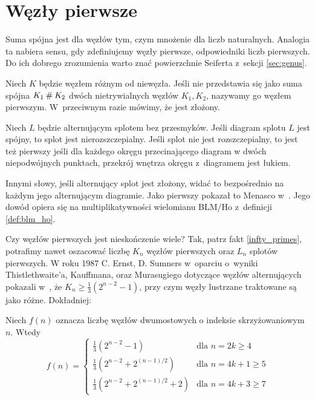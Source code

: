 \section{Węzły pierwsze}
\label{sec:prime_knots}
Suma spójna jest dla węzłów tym, czym mnożenie dla liczb naturalnych.
Analogia ta nabiera sensu, gdy zdefiniujemy węzły pierwsze, odpowiedniki liczb pierwszych.
Do ich dobrego zrozumienia warto znać powierzchnie Seiferta z~sekcji \ref{sec:genus}.

\begin{definition}
    \label{primeknot}
    Niech $K$ będzie węzłem różnym od niewęzła.
    Jeśli nie przedstawia się jako suma spójna $K_1 \mathbin{\#} K_2$
    dwóch nietrywialnych węzłów $K_1, K_2$, nazywamy go węzłem pierwszym.
    W~przeciwnym razie mówimy, że jest złożony.
\end{definition}

\begin{proposition}
    Niech $L$ będzie alternującym splotem bez przesmyków.
    Jeśli diagram splotu $L$ jest spójny, to splot jest nierozszczepialny.
    Jeśli splot nie jest rozszczepialny, to jest też pierwszy jeśli dla każdego okręgu przecinającego diagram w dwóch niepodwójnych punktach, przekrój wnętrza okręgu z~diagramem jest łukiem.
\end{proposition}

Innymi słowy, jeśli alternujący splot jest złożony, widać to bezpośrednio na każdym jego alternującym diagramie.
Jako pierwszy pokazał to Menasco w~\cite{menasco84}.
Jego dowód opiera się na multiplikatywności wielomianu BLM/Ho z~definicji \ref{def:blm_ho}.

Czy węzłów pierwszych jest nieskończenie wiele?
Tak, patrz fakt \ref{infty_primes}, potrafimy nawet oszacować liczbę $K_n$ węzłów pierwszych oraz $L_n$ splotów pierwszych.
W roku 1987 C. Ernst, D. Sumners w~oparciu o~wyniki Thistlethwaite'a, Kauffmana, oraz Murasugiego dotyczące węzłów alternujących pokazali w~\cite{ernst87}, że $K_n \ge \frac 1 3 (2^{n- 2} - 1)$, przy czym węzły lustrzane traktowane są jako różne.
Dokładniej:

\begin{proposition}
    Niech $f(n)$ oznacza liczbę węzłów dwumostowych o indeksie skrzyżowaniowym $n$.
    Wtedy
    \begin{equation}
        f(n) = \begin{cases}
        \frac 13 (2^{n-2} - 1) & \text{dla } n = 2k \ge 4 \\
        \frac 13 (2^{n-2} + 2^{(n-1)/2}) & \text{dla } n = 4k + 1 \ge 5 \\
        \frac 13 (2^{n-2} + 2^{(n-1)/2} + 2) & \text{dla } n = 4k + 3 \ge 7
        \end{cases}
    \end{equation}
\end{proposition}

